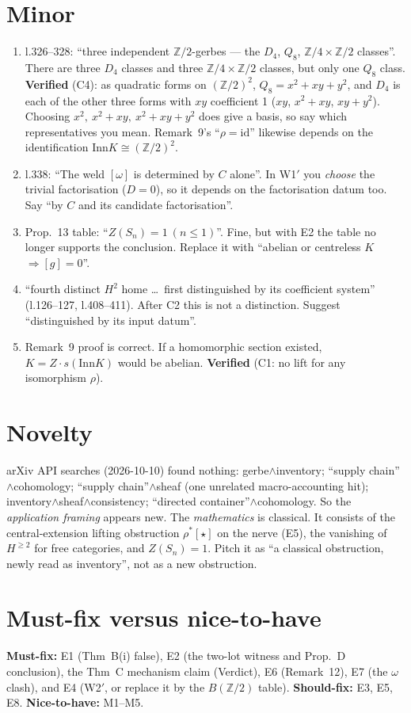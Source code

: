 \documentclass[11pt]{article}
\newcommand{\Z}{\mathbb{Z}}
\begin{document}
\section{Minor}
\begin{enumerate}[label=\textbf{M\arabic*},leftmargin=*]
\item l.326--328: ``three independent $\Z/2$-gerbes --- the $D_4$, $Q_8$, $\Z/4\times\Z/2$
classes''. There are three $D_4$ classes and three $\Z/4\times\Z/2$ classes, but only one $Q_8$
class. \textbf{Verified} (C4): as quadratic forms on $(\Z/2)^2$, $Q_8=x^2+xy+y^2$, and $D_4$ is each of the other three
forms with $xy$ coefficient 1 ($xy$, $x^2+xy$, $xy+y^2$). Choosing $x^2,\ x^2+xy,\ x^2+xy+y^2$ does give
a basis, so say which representatives you mean. Remark~9's ``$\rho=\mathrm{id}$'' likewise
depends on the identification $\mathrm{Inn}K\cong(\Z/2)^2$.
\item l.338: ``The weld $[\omega]$ is determined by $C$ alone''. In W1$'$ you \emph{choose} the
trivial factorisation ($D=0$), so it depends on the factorisation datum too. Say ``by $C$ and its
candidate factorisation''.
\item Prop.~13 table: ``$Z(S_n)=1\ (n\le1)$''. Fine, but with E2 the table no longer supports the
conclusion. Replace it with ``abelian or centreless $K$ $\Rightarrow[g]=0$''.
\item ``fourth distinct $H^2$ home \dots\ first distinguished by its coefficient system'' (l.126--127,
l.408--411). After C2 this is not a distinction. Suggest ``distinguished by its input datum''.
\item Remark~9 proof is correct. If a homomorphic section existed, $K=Z\cdot s(\mathrm{Inn}K)$ would
be abelian. \textbf{Verified} (C1: no lift for any isomorphism $\rho$).
\end{enumerate}

\section{Novelty}
arXiv API searches (2026-10-10) found nothing: gerbe$\wedge$inventory; ``supply chain''$\wedge$cohomology;
``supply chain''$\wedge$sheaf (one unrelated macro-accounting hit); inventory$\wedge$sheaf$\wedge$consistency;
``directed container''$\wedge$cohomology. So the \emph{application framing} appears new. The
\emph{mathematics} is classical. It consists of the central-extension lifting obstruction $\rho^*[\star]$
on the nerve (E5), the vanishing of $H^{\ge2}$ for free categories, and $Z(S_n)=1$. Pitch it as
``a classical obstruction, newly read as inventory'', not as a new obstruction.

\section*{Must-fix versus nice-to-have}
\textbf{Must-fix:} E1 (Thm~B(i) false), E2 (the two-lot witness and Prop.~D conclusion), the Thm~C
mechanism claim (Verdict), E6 (Remark~12), E7 (the $\omega$ clash), and E4 (W2$'$, or replace it
by the $B(\Z/2)$ table). \textbf{Should-fix:} E3, E5, E8. \textbf{Nice-to-have:} M1--M5.
\end{document}
